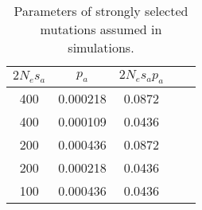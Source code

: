 \begin{table}[h!]
\centering
\caption[Parameters of strongly selected mutations assumed in simulations]{Parameters of strongly selected mutations assumed in simulations.}
 \begin{tabular}{c c c c c } 

\toprule
$2N_es_a	$ & $p_a$	& $2N_es_ap_a$ \\ \hline
400 &	0.000218	 & 0.0872 \\
400 &	0.000109	 & 0.0436 \\
200 &	0.000436	 & 0.0872 \\
200 &	0.000218	 & 0.0436 \\
100 &	0.000436	 & 0.0436 \\
\bottomrule

\end{tabular}
\label{tab:C3S7}
\end{table}